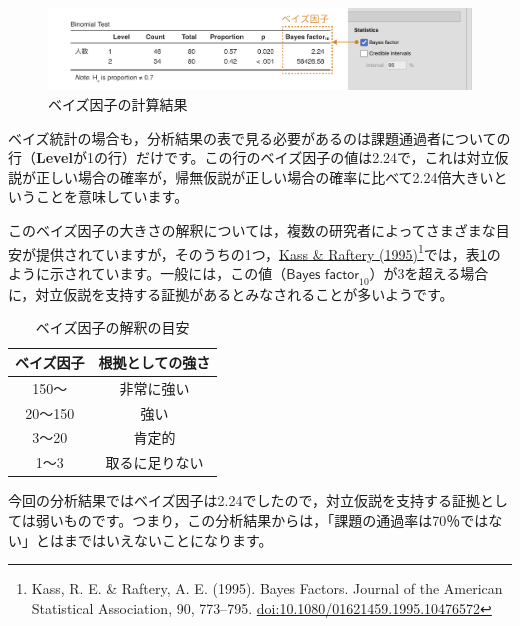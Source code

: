 \documentclass[
  12pt,
  a5jpaper,
  lualatex, ja=standard]{bxjsbook}
\begin{document}
\begin{figure}[!ht]

{\centering \includegraphics[width=1\linewidth]{images/frequencies/binomial-bayes-results} 

}

\caption{ベイズ因子の計算結果}\label{fig:frequencies-binomial-bayes-results}
\end{figure}

ベイズ統計の場合も，分析結果の表で見る必要があるのは課題通過者についての行（\textbf{Level}が1の行）だけです。この行のベイズ因子の値は2.24で，これは対立仮説が正しい場合の確率が，帰無仮説が正しい場合の確率に比べて2.24倍大きいということを意味しています。

このベイズ因子の大きさの解釈については，複数の研究者によってさまざまな目安が提供されていますが，そのうちの1つ，\href{https://www.tandfonline.com/doi/abs/10.1080/01621459.1995.10476572}{Kass \& Raftery (1995)}\footnote{
  Kass, R. E. \& Raftery, A. E. (1995). Bayes Factors. Journal of the American Statistical Association, 90, 773--795. \url{doi:10.1080/01621459.1995.10476572}}では，表\ref{tab:frequencies-binomial-bayes-factor-interpretation}のように示されています。一般には，この値（\(\textsf{Bayes factor}_{10}\)）が3を超える場合に，対立仮説を支持する証拠があるとみなされることが多いようです。

\begin{table}[H]

\caption{\label{tab:frequencies-binomial-bayes-factor-interpretation}ベイズ因子の解釈の目安}
\centering
\begin{tabular}[t]{cc}
\toprule
ベイズ因子 & 根拠としての強さ\\
\midrule
150〜 & 非常に強い\\
20〜150 & 強い\\
3〜20 & 肯定的\\
1〜3 & 取るに足りない\\
\bottomrule
\end{tabular}
\end{table}

今回の分析結果ではベイズ因子は2.24でしたので，対立仮説を支持する証拠としては弱いものです。つまり，この分析結果からは，「課題の通過率は70％ではない」とはまではいえないことになります。
\end{document}
